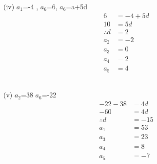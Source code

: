 \documentclass[journal,12pt,twocolumn]{IEEEtran}
\theoremstyle{remark}
\begin{document}
     (iv) $a_1$=-4 , $a_6$=6, $a_6$=a+5d\\
\begin{align}
     6&=-4+5d\\
     10&=5d\\
     \therefore d&=2\\
          a_2&=-2\\
          a_3&=0\\
          a_4&=2\\
          a_5&=4
\end{align}
          \\ \vspace{0.25cm} 
          
     (v)  $a_2$=38 $a_6$=-22 \\
     \begin{align}
         -22-38&=4d\\
          -60&=4d\\
           \therefore d&=-15\\
            a_1&=53\\
            a_3&=23\\
            a_4&=8\\
            a_5&=-7\\
     \end{align}
             
          
\end{document}

